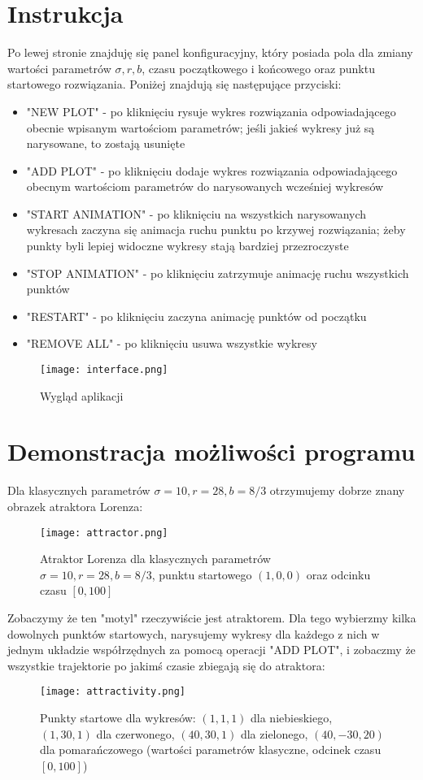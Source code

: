 \documentclass[12pt]{report}
\begin{document}
	\section{Instrukcja}
	\par Po lewej stronie znajduję się panel konfiguracyjny, który posiada pola dla zmiany wartości parametrów $\sigma, r, b$, czasu początkowego i końcowego oraz punktu startowego rozwiązania. Poniżej znajdują się następujące przyciski:
	\begin{itemize}
		\item "NEW PLOT" - po kliknięciu rysuje wykres rozwiązania odpowiadającego obecnie wpisanym wartościom parametrów; jeśli jakieś wykresy już są narysowane, to zostają usunięte
		\item "ADD PLOT" - po kliknięciu dodaje wykres rozwiązania odpowiadającego obecnym wartościom parametrów do narysowanych wcześniej wykresów
		\item "START ANIMATION" - po kliknięciu na wszystkich narysowanych wykresach zaczyna się animacja ruchu punktu po krzywej rozwiązania; żeby punkty byli lepiej widoczne wykresy stają bardziej przezroczyste
		\item "STOP ANIMATION" - po kliknięciu zatrzymuje animację ruchu wszystkich punktów
		\item "RESTART" - po kliknięciu zaczyna animację punktów od początku 
		\item "REMOVE ALL" - po kliknięciu usuwa wszystkie wykresy
	\end{itemize}
	\begin{figure}[H]
		\centering
		\texttt{[image: interface.png]}
		\caption{Wygląd aplikacji}
		\label{fig:interface}
	\end{figure}

	\section{Demonstracja możliwości programu}
	\par Dla klasycznych parametrów $\sigma = 10, r = 28, b = 8/3$ otrzymujemy dobrze znany obrazek atraktora Lorenza:
	\begin{figure}[H]
		\centering
		\texttt{[image: attractor.png]}
		\caption{Atraktor Lorenza dla klasycznych parametrów $\sigma = 10, r = 28, b = 8/3$, punktu startowego $(1, 0, 0)$ oraz odcinku czasu $[0, 100]$}
		\label{fig:attractor}
	\end{figure}
	Zobaczymy że ten "motyl" rzeczywiście jest atraktorem. Dla tego wybierzmy kilka dowolnych punktów startowych, narysujemy wykresy dla każdego z nich w jednym układzie współrzędnych za pomocą operacji "ADD PLOT", i zobaczmy że wszystkie trajektorie po jakimś czasie zbiegają się do atraktora:
	\begin{figure}[H]
		\centering
		\texttt{[image: attractivity.png]}
		\caption{Punkty startowe dla wykresów: $(1, 1, 1)$ dla niebieskiego, $(1, 30, 1)$ dla czerwonego, $(40, 30, 1)$ dla zielonego, $(40, -30, 20)$ dla pomarańczowego (wartości parametrów klasyczne, odcinek czasu $[0, 100]$)}
		\label{fig:attractivity}
	\end{figure}
\end{document}
